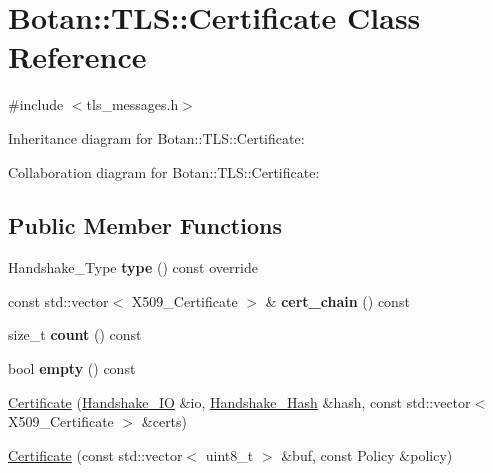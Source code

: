 \hypertarget{class_botan_1_1_t_l_s_1_1_certificate}{}\section{Botan\+:\+:T\+LS\+:\+:Certificate Class Reference}
\label{class_botan_1_1_t_l_s_1_1_certificate}


{\ttfamily \#include $<$tls\+\_\+messages.\+h$>$}



Inheritance diagram for Botan\+:\+:T\+LS\+:\+:Certificate\+:


Collaboration diagram for Botan\+:\+:T\+LS\+:\+:Certificate\+:
\subsection*{Public Member Functions}
\begin{DoxyCompactItemize}
\item 
\mbox{\label{class_botan_1_1_t_l_s_1_1_certificate_a38a8ef8264fb2a06a4343971beab4a8f}} 
Handshake\+\_\+\+Type {\bfseries type} () const override
\item 
\mbox{\label{class_botan_1_1_t_l_s_1_1_certificate_ab326625098b883d10050fa4cb4d8fd7a}} 
const std\+::vector$<$ X509\+\_\+\+Certificate $>$ \& {\bfseries cert\+\_\+chain} () const
\item 
\mbox{\label{class_botan_1_1_t_l_s_1_1_certificate_ab21ceccfc2c6764d281157d5b1a43047}} 
size\+\_\+t {\bfseries count} () const
\item 
\mbox{\label{class_botan_1_1_t_l_s_1_1_certificate_a2a9116b2a75bb4bc85e285a740e98419}} 
bool {\bfseries empty} () const
\item 
\mbox{\hyperlink{class_botan_1_1_t_l_s_1_1_certificate_a115ec120b433f9572103ecf40833b32c}{Certificate}} (\mbox{\hyperlink{class_botan_1_1_t_l_s_1_1_handshake___i_o}{Handshake\+\_\+\+IO}} \&io, \mbox{\hyperlink{class_botan_1_1_t_l_s_1_1_handshake___hash}{Handshake\+\_\+\+Hash}} \&hash, const std\+::vector$<$ X509\+\_\+\+Certificate $>$ \&certs)
\item 
\mbox{\hyperlink{class_botan_1_1_t_l_s_1_1_certificate_a2000a5fbaabfa453f0fe94daea1af96b}{Certificate}} (const std\+::vector$<$ uint8\+\_\+t $>$ \&buf, const Policy \&policy)
\end{DoxyCompactItemize}


